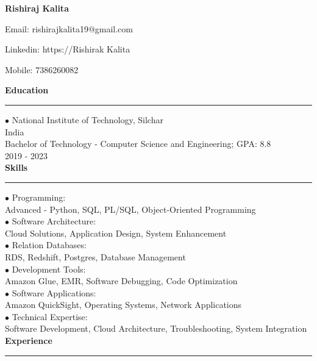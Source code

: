 \documentclass[11pt,a4paper]{article}
\renewcommand{\section}[1]{%
  \vspace{12pt}%
  {\large\bfseries #1}%
  \vspace{6pt}%
  \hrule%
  \vspace{6pt}%
}
\begin{document}
\begin{center}\Huge\textbf{Rishiraj Kalita}\\[0.5cm]\end{center}

\begin{center}Email: rishirajkalita19@gmail.com\end{center}
\begin{center}Linkedin: https://Rishirak Kalita\end{center}
\begin{center}Mobile: 7386260082\end{center}
\section{Education}

\noindent $\bullet$ National Institute of Technology, Silchar\\[0.2cm]
India\\[0.2cm]
Bachelor of Technology - Computer Science and Engineering; GPA: 8.8\\[0.2cm]
2019 - 2023\\[0.2cm]
\section{Skills}

\noindent $\bullet$ Programming:\\[0.2cm]
Advanced - Python, SQL, PL/SQL, Object-Oriented Programming\\[0.2cm]
\noindent $\bullet$ Software Architecture:\\[0.2cm]
Cloud Solutions, Application Design, System Enhancement\\[0.2cm]
\noindent $\bullet$ Relation Databases:\\[0.2cm]
RDS, Redshift, Postgres, Database Management\\[0.2cm]
\noindent $\bullet$ Development Tools:\\[0.2cm]
Amazon Glue, EMR, Software Debugging, Code Optimization\\[0.2cm]
\noindent $\bullet$ Software Applications:\\[0.2cm]
Amazon QuickSight, Operating Systems, Network Applications\\[0.2cm]
\noindent $\bullet$ Technical Expertise:\\[0.2cm]
Software Development, Cloud Architecture, Troubleshooting, System Integration\\[0.2cm]
\section{Experience}
\end{document}
